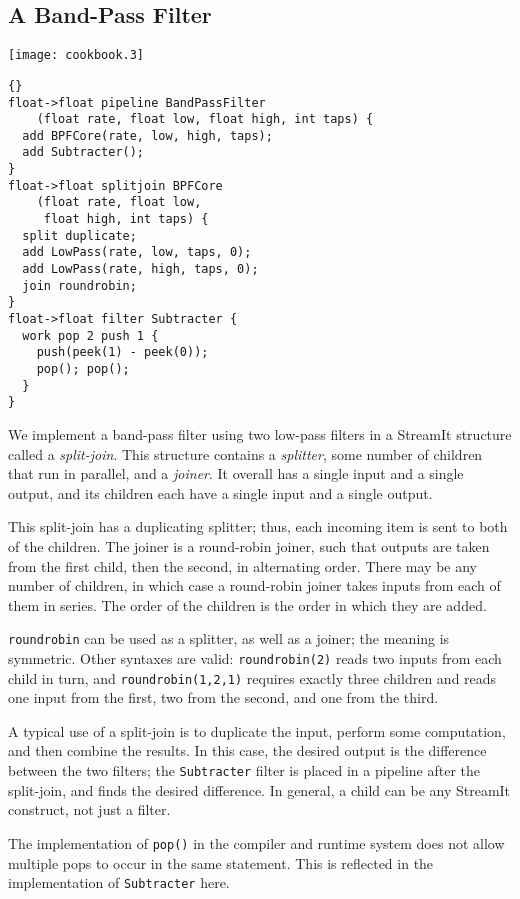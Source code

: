 \clearpage
\subsection{A Band-Pass Filter}

\begin{textpic}{\texttt{[image: cookbook.3]}}
\begin{lstlisting}{}
float->float pipeline BandPassFilter 
    (float rate, float low, float high, int taps) {
  add BPFCore(rate, low, high, taps);
  add Subtracter();
}
float->float splitjoin BPFCore 
    (float rate, float low, 
     float high, int taps) {
  split duplicate;
  add LowPass(rate, low, taps, 0);
  add LowPass(rate, high, taps, 0);
  join roundrobin;
}
float->float filter Subtracter {
  work pop 2 push 1 {
    push(peek(1) - peek(0));
    pop(); pop();
  }
}
\end{lstlisting}
\end{textpic}

We implement a band-pass filter using two low-pass filters in a
StreamIt structure called a \emph{split-join}.  This structure
contains a \emph{splitter}, some number of children that run in
parallel, and a \emph{joiner}.  It overall has a single input and a
single output, and its children each have a single input and a single
output.

This split-join has a duplicating splitter; thus, each incoming item
is sent to both of the children.  The joiner is a round-robin joiner,
such that outputs are taken from the first child, then the second, in
alternating order.  There may be any number of children, in which case
a round-robin joiner takes inputs from each of them in series.  The
order of the children is the order in which they are added.

\lstinline|roundrobin| can be used as a splitter, as well as a joiner;
the meaning is symmetric.  Other syntaxes are valid:
\lstinline|roundrobin(2)| reads two inputs from each child in turn,
and \lstinline|roundrobin(1,2,1)| requires exactly three children and
reads one input from the first, two from the second, and one from the
third.

A typical use of a split-join is to duplicate the input, perform some
computation, and then combine the results.  In this case, the desired
output is the difference between the two filters; the
\lstinline|Subtracter| filter is placed in a pipeline after the
split-join, and finds the desired difference.  In general, a child can
be any StreamIt construct, not just a filter.

The implementation of \lstinline|pop()| in the compiler and runtime
system does not allow multiple pops to occur in the same statement.
This is reflected in the implementation of \lstinline|Subtracter|
here.